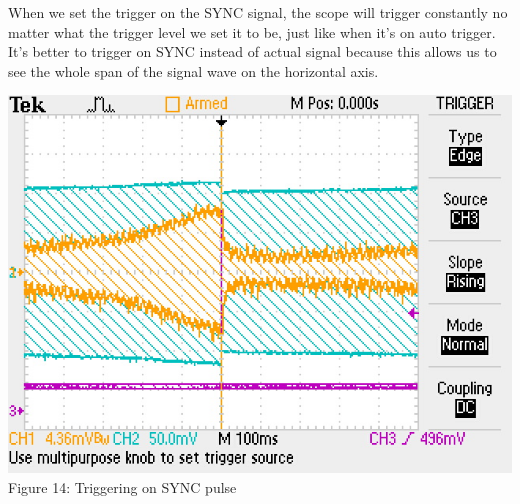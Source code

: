 \documentclass[]{article}
\begin{document}
	When we set the trigger on the SYNC signal, the scope will trigger constantly no matter what the trigger level we set it to be, just like when it's on auto trigger. It's better to trigger on SYNC instead of actual signal because this allows us to see the whole span of the signal wave on the horizontal axis. 
	\begin{center}
		\includegraphics[scale=0.7]{e_sync}\\
		Figure 14: Triggering on SYNC pulse
	\end{center}
		
\end{document}
